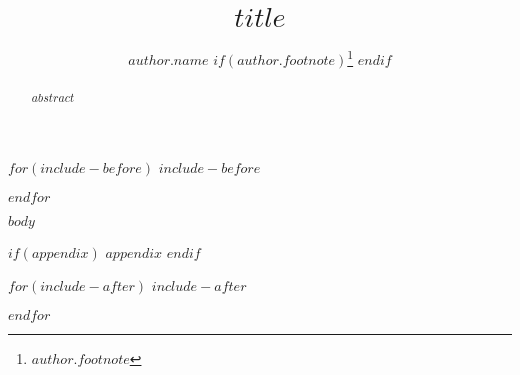 \documentclass[$format$ ,$hyphenation$ $if(authorcolumns)$ ,authorcolumns $endif$ $if(cleveref)$,cleveref$endif$ $if(autoref)$,autoref$endif$ $if(thm-restate)$,thm-restate$endif$ $if(anonymous)$,anonymous$endif$ $if(numberwithinsect)$,numberwithinsect$endif$ ]{lipics-v2019}
\title{$title$}
\author{$author.name$ $if(author.footnote)$\footnote{$author.footnote$} $endif$}{$author.affiliation$}{$author.email$}{$author.orcid$}{$if(author.funding)$ $author.funding$ $endif$}
\begin{document}
$for(include-before)$
$include-before$

$endfor$


\maketitle

\begin{abstract}
$abstract$
\end{abstract}

$body$





$if(appendix)$
\appendix
$appendix$
$endif$

$for(include-after)$
$include-after$

$endfor$
\end{document}
